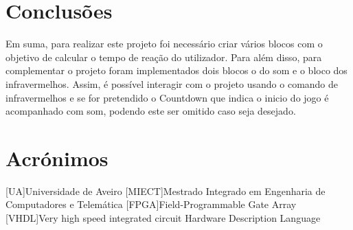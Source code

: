 \documentclass[a4paper,11pt,onecolumn]{report}
\begin{document}
\chapter{Conclusões}
\label{chap.conclusao}
Em suma, para realizar este projeto foi necessário criar vários blocos com o objetivo de calcular o tempo de reação do utilizador. Para além disso, para complementar o projeto foram implementados dois blocos o do som e o bloco dos infravermelhos. Assim, é possível interagir com o projeto usando o comando de infravermelhos e se for pretendido o Countdown que indica o inicio do jogo é acompanhado com som, podendo este ser omitido caso seja desejado. 


\chapter*{Acrónimos}
\begin{acronym}
[UA]{Universidade de Aveiro}
[MIECT]{Mestrado Integrado em Engenharia de Computadores e Telemática}
[FPGA]{Field-Programmable Gate Array}
[VHDL]{Very high speed integrated circuit Hardware Description Language}

\end{acronym}


\end{document}
